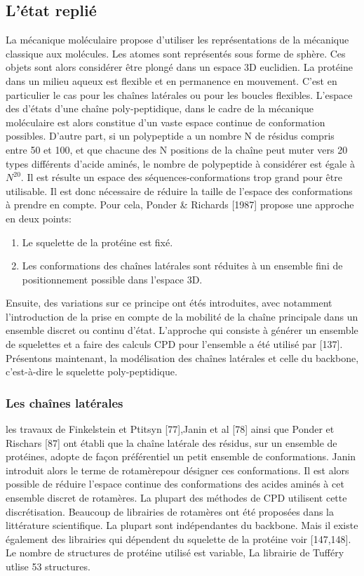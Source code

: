 \subsection{L'état replié }
La mécanique moléculaire propose d'utiliser les représentations de la mécanique classique aux molécules. Les atomes sont représentés sous forme de sphère. Ces objets sont alors considérer être plongé dans un espace 3D euclidien.
La protéine dans un milieu aqueux est flexible et en permanence en mouvement. C'est en particulier le cas pour les chaînes latérales ou pour les boucles flexibles. L'espace des d'états d'une chaîne poly-peptidique, dans le cadre de la mécanique moléculaire est alors constitue d'un vaste espace continue de conformation possibles. D'autre part, si un polypeptide a un nombre N de résidus compris entre 50 et 100, et que chacune des N positions de la chaîne peut muter vers 20 types différents d'acide aminés, le nombre de polypeptide à considérer est égale à  $N^{20}$. Il est résulte un espace des séquences-conformations trop grand pour être utilisable. Il est donc nécessaire de réduire la taille de l'espace des conformations à prendre en compte. Pour cela, Ponder & Richards [1987] propose une approche en deux points:
\begin{enumerate}
\item Le squelette de la protéine est fixé.
\item Les conformations des chaînes latérales sont réduites à un ensemble fini de positionnement possible dans l'espace 3D.
\end{enumerate}  
Ensuite, des variations sur ce principe ont étés introduites, avec notamment l'introduction de la prise en compte de la mobilité de la chaîne principale dans un ensemble discret ou continu d'état. L'approche qui consiste à générer un ensemble de squelettes et a faire des calculs CPD pour l'ensemble a été utilisé par [137]. 
Présentons maintenant, la modélisation des chaînes latérales et celle du backbone, c'est-à-dire le squelette poly-peptidique.

\subsubsection{Les chaînes latérales}

les travaux de Finkelstein et Ptitsyn [77],Janin et al [78] ainsi que Ponder et Rischars [87] ont établi que la chaîne latérale des résidus, sur un ensemble de protéines, adopte de façon préférentiel un petit ensemble de conformations. Janin introduit alors le terme de \og rotamère\fg pour désigner ces conformations. Il est alors possible de réduire l'espace continue des conformations des acides aminés à cet ensemble discret de rotamères. La plupart des méthodes de CPD utilisent cette discrétisation. Beaucoup de librairies de rotamères ont été proposées dans la littérature scientifique. La plupart sont indépendantes du backbone. Mais il existe également des librairies qui dépendent du squelette de la protéine voir [147,148]. Le nombre de structures de protéine utilisé est variable, La librairie de Tufféry utlise 53 structures. 

